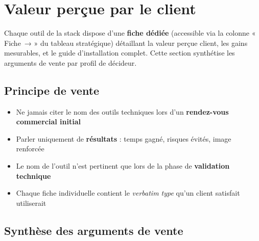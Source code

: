 \section{Valeur perçue par le client}

\begin{pointcle}
  Chaque outil de la stack dispose d'une \textbf{fiche dédiée} (accessible via la colonne « Fiche~→ » du tableau stratégique) détaillant la valeur perçue client, les gains mesurables, et le guide d'installation complet. Cette section synthétise les arguments de vente par profil de décideur.
\end{pointcle}

\subsection{Principe de vente}

\begin{itemize}
  \item Ne jamais citer le nom des outils techniques lors d'un \textbf{rendez-vous commercial initial}
  \item Parler uniquement de \textbf{résultats} : temps gagné, risques évités, image renforcée
  \item Le nom de l'outil n'est pertinent que lors de la phase de \textbf{validation technique}
  \item Chaque fiche individuelle contient le \textit{verbatim type} qu'un client satisfait utiliserait
\end{itemize}

\subsection{Synthèse des arguments de vente}

